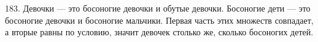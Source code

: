 183. Девочки --- это босоногие девочки и обутые девочки. Босоногие дети --- это босоногие девочки и босоногие мальчики. Первая часть этих множеств совпадает, а вторые равны по условию, значит девочек столько же, сколько босоногих детей.\\
